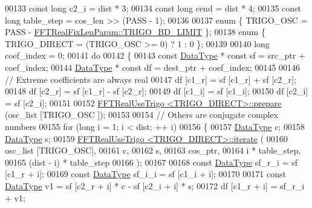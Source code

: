 \begin{DoxyCode}
00133     \textcolor{keyword}{const} \textcolor{keywordtype}{long}      c2\_i = dist * 3;
00134     \textcolor{keyword}{const} \textcolor{keywordtype}{long}      cend = dist * 4;
00135     \textcolor{keyword}{const} \textcolor{keywordtype}{long}      table\_step = cos\_len >> (PASS - 1);
00136 
00137    \textcolor{keyword}{enum} \{   TRIGO\_OSC       = PASS - \hyperlink{a00012_a7a7b234f07dec3342f211f70fc354249acc7080c97a1906e1284b5c5b467bf068}{FFTRealFixLenParam::TRIGO\_BD\_LIMIT}   
      \};
00138     \textcolor{keyword}{enum} \{  TRIGO\_DIRECT    = (TRIGO\_OSC >= 0) ? 1 : 0  \};
00139 
00140     \textcolor{keywordtype}{long}                coef\_index = 0;
00141     \textcolor{keywordflow}{do}
00142     \{
00143         \textcolor{keyword}{const} \hyperlink{a00013_a831663a8e0b1414e80f82cd3d18b5b6b}{DataType}  * \textcolor{keyword}{const} sf = src\_ptr + coef\_index;
00144         \hyperlink{a00013_a831663a8e0b1414e80f82cd3d18b5b6b}{DataType}            * \textcolor{keyword}{const} df = dest\_ptr + coef\_index;
00145 
00146         \textcolor{comment}{// Extreme coefficients are always real}
00147         df [c1\_r] = sf [c1\_r] + sf [c2\_r];
00148         df [c2\_r] = sf [c1\_r] - sf [c2\_r];
00149         df [c1\_i] = sf [c1\_i];
00150         df [c2\_i] = sf [c2\_i];
00151 
00152         \hyperlink{a00016}{FFTRealUseTrigo <TRIGO\_DIRECT>::prepare} (osc\_list [TRIGO\_OSC
      ]);
00153 
00154         \textcolor{comment}{// Others are conjugate complex numbers}
00155         \textcolor{keywordflow}{for} (\textcolor{keywordtype}{long} i = 1; i < dist; ++ i)
00156         \{
00157             \hyperlink{a00013_a831663a8e0b1414e80f82cd3d18b5b6b}{DataType}            c;
00158             \hyperlink{a00013_a831663a8e0b1414e80f82cd3d18b5b6b}{DataType}            s;
00159             \hyperlink{a00016}{FFTRealUseTrigo <TRIGO\_DIRECT>::iterate} (
00160                 osc\_list [TRIGO\_OSC],
00161                 c,
00162                 s,
00163                 cos\_ptr,
00164                 i * table\_step,
00165                 (dist - i) * table\_step
00166             );
00167 
00168             \textcolor{keyword}{const} \hyperlink{a00013_a831663a8e0b1414e80f82cd3d18b5b6b}{DataType}  sf\_r\_i = sf [c1\_r + i];
00169             \textcolor{keyword}{const} \hyperlink{a00013_a831663a8e0b1414e80f82cd3d18b5b6b}{DataType}  sf\_i\_i = sf [c1\_i + i];
00170 
00171             \textcolor{keyword}{const} \hyperlink{a00013_a831663a8e0b1414e80f82cd3d18b5b6b}{DataType}  v1 = sf [c2\_r + i] * c - sf [c2\_i + i] * s;
00172             df [c1\_r + i] = sf\_r\_i + v1;

\end{DoxyCode}
